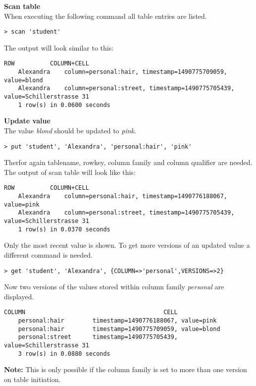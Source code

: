 \textbf{Scan table} \\
When executing the following command all table entries are listed.
\begin{lstlisting}[caption={scan table},label=lst:scan_table]
	> scan 'student'
\end{lstlisting}

The output will look similar to this:

\begin{lstlisting}[caption={output of the table scan 1},label=lst:table_scan_output]
	ROW          COLUMN+CELL
	Alexandra    column=personal:hair, timestamp=1490775709059, value=blond
	Alexandra    column=personal:street, timestamp=1490775705439, value=Schillerstrasse 31
	1 row(s) in 0.0600 seconds
\end{lstlisting}

\textbf{Update value} \\
The value \textit{blond} should be updated to \textit{pink}.
\begin{lstlisting}[caption={update value},label=lst:update_value]
	> put 'student', 'Alexandra', 'personal:hair', 'pink'
\end{lstlisting}
Therfor again tablename, rowkey, column family and column qualifier are needed.
The output of scan table will look like this:
\begin{lstlisting}[caption={output of the table scan 2},label=lst:table_scan_output_2]
	ROW          COLUMN+CELL
	Alexandra    column=personal:hair, timestamp=1490776188067, value=pink
	Alexandra    column=personal:street, timestamp=1490775705439, value=Schillerstrasse 31
	1 row(s) in 0.0370 seconds
\end{lstlisting}

Only the most recent value is shown. To get more versions of an updated value a different command is needed.

\begin{lstlisting}[caption={get multiple versions},label=lst:get_multiple_versions]
	> get 'student', 'Alexandra', {COLUMN=>'personal',VERSIONS=>2}
\end{lstlisting}

\newpage
Now two versions of the values stored within column family \textit{personal} are displayed.
\begin{lstlisting}[caption={output of the table scan 3},label=lst:table_scan_output_3]
	COLUMN                                       CELL
	personal:hair        timestamp=1490776188067, value=pink
	personal:hair        timestamp=1490775709059, value=blond
	personal:street      timestamp=1490775705439, value=Schillerstrasse 31
	3 row(s) in 0.0880 seconds
\end{lstlisting}
\textbf{Note:} This is only possible if the column family is set to more than one version on table initiation. 


